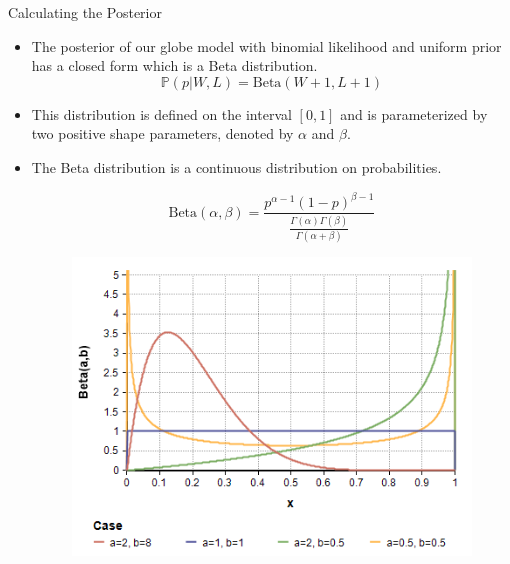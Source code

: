 \documentclass[handout]{beamer}
\begin{document}
\begin{frame}{Calculating the Posterior}
\scriptsize{

\begin{itemize}
\item The posterior of our globe model with binomial likelihood and uniform prior has a closed form which is a Beta distribution.
\begin{displaymath}
\mathbb{P}(p|W,L) = \text{Beta}(W+1 , L+1)
\end{displaymath}

\item This distribution is defined on the interval $[0, 1]$ and is parameterized by two positive shape parameters, denoted by $\alpha$ and $\beta$.

\item The Beta distribution is a continuous distribution on probabilities.

\begin{displaymath}
\text{Beta}(\alpha,\beta)=\frac{p^{\alpha-1}(1-p)^{\beta-1}}{\frac{\Gamma(\alpha)\Gamma(\beta)}{\Gamma(\alpha + \beta)}}
\end{displaymath}

\begin{figure}[h!]
	\centering
	\includegraphics[scale=0.4]{pics/Beta(a,b).png}
\end{figure}

\end{itemize}

} 

\end{frame}
\end{document}
